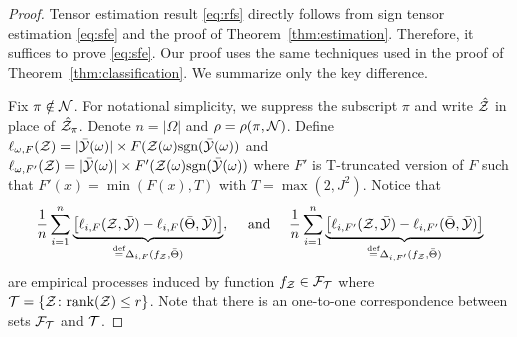\documentclass[11pt]{article}
\theoremstyle{plain}
\theoremstyle{definition}
\newcommand*{\KeepStyleUnderBrace}[1]{%
  \mathop{%
    \mathchoice
    {\underbrace{\displaystyle#1}}%
    {\underbrace{\textstyle#1}}%
    {\underbrace{\scriptstyle#1}}%
    {\underbrace{\scriptscriptstyle#1}}%
  }\limits
}
\def\sign{\textup{sgn}}
\def\rank{\textup{rank}}
\begin{document}
\begin{proof}
Tensor estimation result \eqref{eq:rfs}  directly follows from  sign tensor estimation \eqref{eq:sfe} and the proof of Theorem~\ref{thm:estimation}.
Therefore, it suffices to prove \eqref{eq:sfe}.
Our  proof uses  the same techniques used in the proof of  Theorem~\ref{thm:classification}. We summarize only the key difference.

Fix $\pi\notin\mathcal{N}$. For notational simplicity, we suppress the subscript $\pi$ and write $\hat {\mathcal{Z}}$ in place of $\hat {\mathcal{Z}}_\pi$. Denote $n=|\Omega|$ and $\rho=\rho(\pi, \mathcal{N})$.  
Define $\ell_{\omega,F}(\tZ) =  |\bar\tY(\omega)|\times F(\tZ(\omega)\sign(\bar \tY(\omega))$ and $\ell_{\omega,F'}(\tZ) =  |\bar\tY(\omega)|\times F'(\tZ(\omega)\sign(\bar \tY(\omega))$ where $F'$ is T-truncated version of $F$ such that $F'(x) =  \min(F(x),T)$ with $T=\max(2,J^2)$.  
Notice that 
\begin{align}\label{eq:empirical}
{1\over n}\sum_{i=1}^n \KeepStyleUnderBrace{\left[\ell_{i,F}(\tZ, \bar \tY)-\ell_{i,F}(\bar \Theta, \bar \tY)\right]}_{\stackrel{\text{def}}{=}\Delta_{i,F}(f_\tZ, \bar\Theta)},\quad\text { and }\quad  {1\over n}\sum_{i=1}^n \KeepStyleUnderBrace{\left[\ell_{i,F'}(\tZ, \bar \tY)-\ell_{i,F'}(\bar \Theta, \bar \tY)\right]}_{\stackrel{\text{def}}{=}\Delta_{i,F'}(f_\tZ, \bar\Theta)}
\end{align}
are empirical processes induced by function $f_{\mathcal{Z}}\in \mathcal{F}_{\mathcal{T}}$ where $\tT=\{\tZ\colon \rank(\tZ)\leq r\}$. Note that there is an one-to-one correspondence between sets $\mathcal{F}_{\mathcal{T}}$ and $\mathcal{T}$. 


\end{proof}
\end{document}
